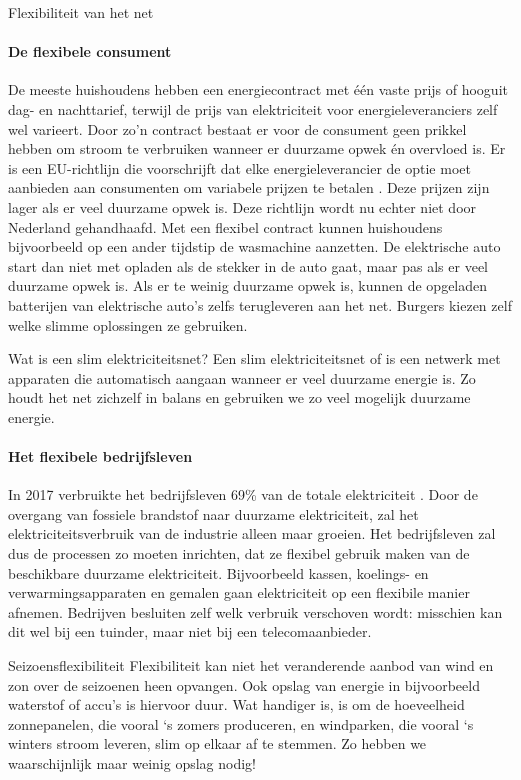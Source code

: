 \begin{voorstel}{Flexibiliteit van het net}
\begin{multicols*}{2}
\begin{overwegingen}
\paragraph{De flexibele consument}
De meeste huishoudens hebben een energiecontract met één vaste prijs of hooguit dag- en nachttarief, terwijl de prijs van elektriciteit voor energieleveranciers zelf wel varieert. Door zo'n contract bestaat er voor de consument geen prikkel hebben om stroom te verbruiken wanneer er duurzame opwek én overvloed is. Er is een EU-richtlijn die voorschrijft dat elke energieleverancier de optie moet aanbieden aan consumenten om variabele prijzen te betalen \parencite{europees_parlement_notitle_nodate}. Deze prijzen zijn lager als er veel duurzame opwek is. Deze richtlijn wordt nu echter niet door Nederland gehandhaafd. Met een flexibel contract kunnen huishoudens bijvoorbeeld op een ander tijdstip de wasmachine aanzetten. De elektrische auto start dan niet met opladen als de stekker in de auto gaat, maar pas als er veel duurzame opwek is. Als er te weinig duurzame opwek is, kunnen de opgeladen batterijen van elektrische auto’s zelfs terugleveren aan het net. Burgers kiezen zelf welke slimme oplossingen ze gebruiken.

\begin{infobox}{Wat is een slim elektriciteitsnet?}
Een slim elektriciteitsnet of  is een netwerk met apparaten die automatisch aangaan wanneer er veel duurzame energie is. Zo houdt het net zichzelf in balans en gebruiken we zo veel mogelijk duurzame energie.
\end{infobox}

\paragraph{Het flexibele bedrijfsleven}
In 2017 verbruikte het bedrijfsleven 69\% van de totale elektriciteit \parencite{centraal_bureau_voor_de_statistiek_statline_nodate}. Door de overgang van fossiele brandstof naar duurzame elektriciteit, zal het elektriciteitsverbruik van de industrie alleen maar groeien. Het bedrijfsleven zal dus de processen zo moeten inrichten, dat ze flexibel gebruik maken van de beschikbare duurzame elektriciteit. Bijvoorbeeld kassen, koelings- en verwarmingsapparaten en gemalen gaan elektriciteit op een flexibile manier afnemen. Bedrijven besluiten zelf welk verbruik verschoven wordt: misschien kan dit wel bij een tuinder, maar niet bij een telecomaanbieder.

\begin{infobox}{Seizoensflexibiliteit}
Flexibiliteit kan niet het veranderende aanbod van wind en zon over de seizoenen heen opvangen. Ook opslag van energie in bijvoorbeeld waterstof of accu’s is hiervoor duur. Wat handiger is, is om de hoeveelheid zonnepanelen, die vooral ‘s zomers produceren, en windparken, die vooral ‘s winters stroom leveren, slim op elkaar af te stemmen. Zo hebben we waarschijnlijk maar weinig opslag nodig!
\end{infobox}


\end{overwegingen}
\end{multicols*}
\end{voorstel}
